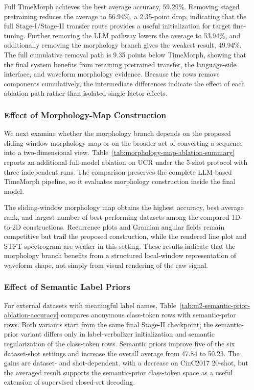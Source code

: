 \documentclass[10pt,journal,compsoc]{IEEEtran}
\begin{document}
Full TimeMorph achieves the best average accuracy, 59.29\%.
Removing staged pretraining reduces the average to 56.94\%, a 2.35-point drop, indicating that the full Stage-I/Stage-II transfer route provides a useful initialization for target fine-tuning.
Further removing the LLM pathway lowers the average to 53.94\%, and additionally removing the morphology branch gives the weakest result, 49.94\%.
The full cumulative removal path is 9.35 points below TimeMorph, showing that the final system benefits from retaining pretrained transfer, the language-side interface, and waveform morphology evidence.
Because the rows remove components cumulatively, the intermediate differences indicate the effect of each ablation path rather than isolated single-factor effects.

\subsubsection{Effect of Morphology-Map Construction}
We next examine whether the morphology branch depends on the proposed sliding-window morphology map or on the broader act of converting a sequence into a two-dimensional view.
Table~\ref{tab:morphology-map-ablation-summary} reports an additional full-model ablation on UCR under the 5-shot protocol with three independent runs.
The comparison preserves the complete LLM-based TimeMorph pipeline, so it evaluates morphology construction inside the final model.


The sliding-window morphology map obtains the highest accuracy, best average rank, and largest number of best-performing datasets among the compared 1D-to-2D constructions.
Recurrence plots and Gramian angular fields remain competitive but trail the proposed construction, while the rendered line plot and STFT spectrogram are weaker in this setting.
These results indicate that the morphology branch benefits from a structured local-window representation of waveform shape, not simply from visual rendering of the raw signal.

\subsubsection{Effect of Semantic Label Priors}
\label{label priors}
For external datasets with meaningful label names, Table~\ref{tab:m2-semantic-prior-ablation-accuracy} compares anonymous class-token rows with semantic-prior rows.
Both variants start from the same final Stage-II checkpoint; the semantic-prior variant differs only in label-verbalizer initialization and semantic regularization of the class-token rows.
Semantic priors improve five of the six dataset-shot settings and increase the overall average from 47.84 to 50.23.
The gains are dataset- and shot-dependent, with a decrease on CinC2017 20-shot, but the averaged result supports the semantic-prior class-token space as a useful extension of supervised closed-set decoding.
\end{document}
